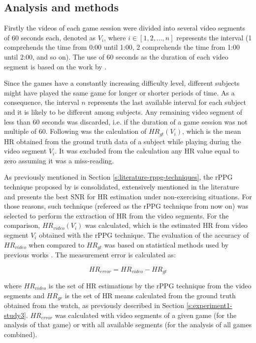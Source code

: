 \subsection{Analysis and methods}

Firstly the videos of each game session were divided into several video segments of 60 seconds each, denoted as $V_i$, where $i \in [1, 2, ..., n]$ represents the interval (1 comprehends the time from 0:00 until 1:00, 2 comprehends the time from 1:00 until 2:00, and so on). The use of 60 seconds as the duration of each video segment is based on the work by \textcite{poh2011advancements}.

Since the games have a constantly increasing difficulty level, different subjects might have played the same game for longer or shorter periods of time. As a consequence, the interval $n$ represents the last available interval for each subject and it is likely to be different among subjects. Any remaining video segment of less than 60 seconds was discarded, i.e. if the duration of a game session was not multiple of 60. Following was the calculation of $HR_{gt}(V_i)$, which is the mean HR obtained from the ground truth data of a subject while playing during the video segment $V_i$. It was excluded from the calculation any HR value equal to zero assuming it was a miss-reading.

As previously mentioned in Section \ref{s:literature-rppg-techniques}, the rPPG technique proposed by \textcite{poh2011advancements} is consolidated, extensively mentioned in the literature and presents the best SNR for HR estimation under non-exercising situations. For those reasons, such technique  (refereed as the rPPG technique from now on) was selected to perform the extraction of HR from the video segments. For the comparison, $HR_{video}(V_i)$ was calculated, which is the estimated HR from video segment $V_i$ obtained with the rPPG technique. The evaluation of the accuracy of $HR_{video}$ when compared to $HR_{gt}$ was based on statistical methods used by previous works \parencite{poh2011advancements, rouast2016remote, li2014remote}. The measurement error is calculated as:

\begin{equation}
\label{eqn:hr-error}
HR_{error} = HR_{video} - HR_{gt}
\end{equation}

where $HR_{video}$ is the set of HR estimations by the rPPG technique from the video segments and $HR_{gr}$ is the set of HR means calculated from the ground truth obtained from the watch, as previously described in Section \ref{s:experiment1-study3}. $HR_{error}$ was calculated with video segments of a given game (for the analysis of that game) or with all available segments (for the analysis of all games combined).

